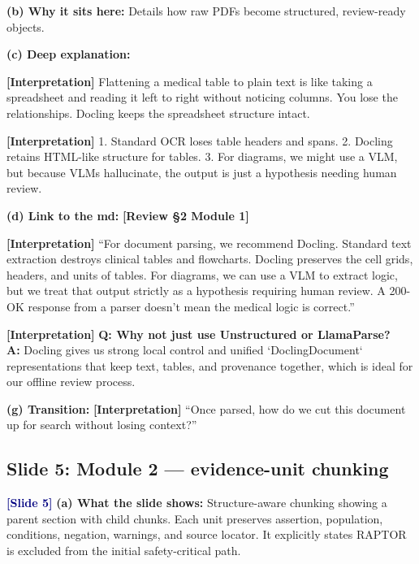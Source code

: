 \documentclass[11pt,a4paper]{article}
\newcommand{\origintag}[2]{\textcolor{#1}{\small\textbf{[#2]}}}
\begin{document}
\textbf{(b) Why it sits here:} Details how raw PDFs become structured, review-ready objects.

\textbf{(c) Deep explanation:}
\begin{analogy}
\origintag{slate}{Interpretation} Flattening a medical table to plain text is like taking a spreadsheet and reading it left to right without noticing columns. You lose the relationships. Docling keeps the spreadsheet structure intact.
\end{analogy}
\origintag{slate}{Interpretation} 1. Standard OCR loses table headers and spans. 2. Docling retains HTML-like structure for tables. 3. For diagrams, we might use a VLM, but because VLMs hallucinate, the output is just a hypothesis needing human review.

\textbf{(d) Link to the md:} \origintag{amber}{Review \S2 Module 1}

\begin{sayit}
\origintag{slate}{Interpretation} ``For document parsing, we recommend Docling. Standard text extraction destroys clinical tables and flowcharts. Docling preserves the cell grids, headers, and units of tables. For diagrams, we can use a VLM to extract logic, but we treat that output strictly as a hypothesis requiring human review. A 200-OK response from a parser doesn't mean the medical logic is correct.''
\end{sayit}

\begin{qa}
\origintag{slate}{Interpretation} \textbf{Q: Why not just use Unstructured or LlamaParse?} \\
\textbf{A:} Docling gives us strong local control and unified `DoclingDocument` representations that keep text, tables, and provenance together, which is ideal for our offline review process.
\end{qa}
\textbf{(g) Transition:} \origintag{slate}{Interpretation} ``Once parsed, how do we cut this document up for search without losing context?''

\subsection{Slide 5: Module 2 --- evidence-unit chunking}
\origintag{navy}{Slide 5}
\textbf{(a) What the slide shows:} Structure-aware chunking showing a parent section with child chunks. Each unit preserves assertion, population, conditions, negation, warnings, and source locator. It explicitly states RAPTOR is excluded from the initial safety-critical path.
\end{document}
